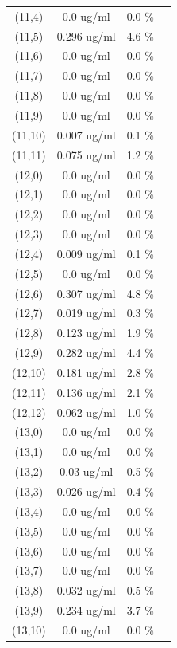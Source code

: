 \documentclass{article}
\begin{document}
\begin{tabular}{c c c c}
(11,4)&        0.0 ug/ml        &0.0 \%\\
(11,5)&        0.296 ug/ml        &4.6 \%\\
(11,6)&        0.0 ug/ml        &0.0 \%\\
(11,7)&        0.0 ug/ml        &0.0 \%\\
(11,8)&        0.0 ug/ml        &0.0 \%\\
(11,9)&        0.0 ug/ml        &0.0 \%\\
(11,10)&        0.007 ug/ml        &0.1 \%\\
(11,11)&        0.075 ug/ml        &1.2 \%\\
(12,0)&        0.0 ug/ml        &0.0 \%\\
(12,1)&        0.0 ug/ml        &0.0 \%\\
(12,2)&        0.0 ug/ml        &0.0 \%\\
(12,3)&        0.0 ug/ml        &0.0 \%\\
(12,4)&        0.009 ug/ml        &0.1 \%\\
(12,5)&        0.0 ug/ml        &0.0 \%\\
(12,6)&        0.307 ug/ml        &4.8 \%\\
(12,7)&        0.019 ug/ml        &0.3 \%\\
(12,8)&        0.123 ug/ml        &1.9 \%\\
(12,9)&        0.282 ug/ml        &4.4 \%\\
(12,10)&        0.181 ug/ml        &2.8 \%\\
(12,11)&        0.136 ug/ml        &2.1 \%\\
(12,12)&        0.062 ug/ml        &1.0 \%\\
(13,0)&        0.0 ug/ml        &0.0 \%\\
(13,1)&        0.0 ug/ml        &0.0 \%\\
(13,2)&        0.03 ug/ml        &0.5 \%\\
(13,3)&        0.026 ug/ml        &0.4 \%\\
(13,4)&        0.0 ug/ml        &0.0 \%\\
(13,5)&        0.0 ug/ml        &0.0 \%\\
(13,6)&        0.0 ug/ml        &0.0 \%\\
(13,7)&        0.0 ug/ml        &0.0 \%\\
(13,8)&        0.032 ug/ml        &0.5 \%\\
(13,9)&        0.234 ug/ml        &3.7 \%\\
(13,10)&        0.0 ug/ml        &0.0 \%\\

\end{tabular}
\end{document}
